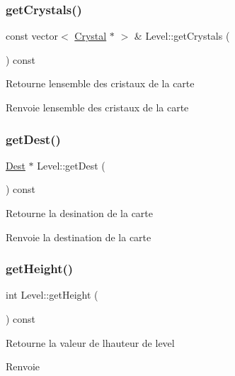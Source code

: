 \subsubsection{\texorpdfstring{getCrystals()}{getCrystals()}}
{\footnotesize\ttfamily const vector$<$ \mbox{\hyperlink{class_crystal}{Crystal}} $\ast$ $>$ \& Level\+::get\+Crystals (\begin{DoxyParamCaption}{ }\end{DoxyParamCaption}) const}

Retourne l\textquotesingle{}ensemble des cristaux de la carte \begin{DoxyReturn}{Renvoie}
l\textquotesingle{}ensemble des cristaux de la carte 
\end{DoxyReturn}
\mbox{\label{class_level_ab8a1974d8fe1c381dddb9cdfdf8bd929}} 
\subsubsection{\texorpdfstring{getDest()}{getDest()}}
{\footnotesize\ttfamily \mbox{\hyperlink{class_dest}{Dest}} $\ast$ Level\+::get\+Dest (\begin{DoxyParamCaption}{ }\end{DoxyParamCaption}) const}

Retourne la desination de la carte \begin{DoxyReturn}{Renvoie}
la destination de la carte 
\end{DoxyReturn}
\mbox{\label{class_level_a2bc17614afdfca9a7c7ea5771a70426a}} 
\subsubsection{\texorpdfstring{getHeight()}{getHeight()}}
{\footnotesize\ttfamily int Level\+::get\+Height (\begin{DoxyParamCaption}{ }\end{DoxyParamCaption}) const}

Retourne la valeur de l\textquotesingle{}hauteur de level \begin{DoxyReturn}{Renvoie}

\end{DoxyReturn}
\mbox{\label{class_level_ad26edebecbd623c348154eaf5e51cbb1}} 
